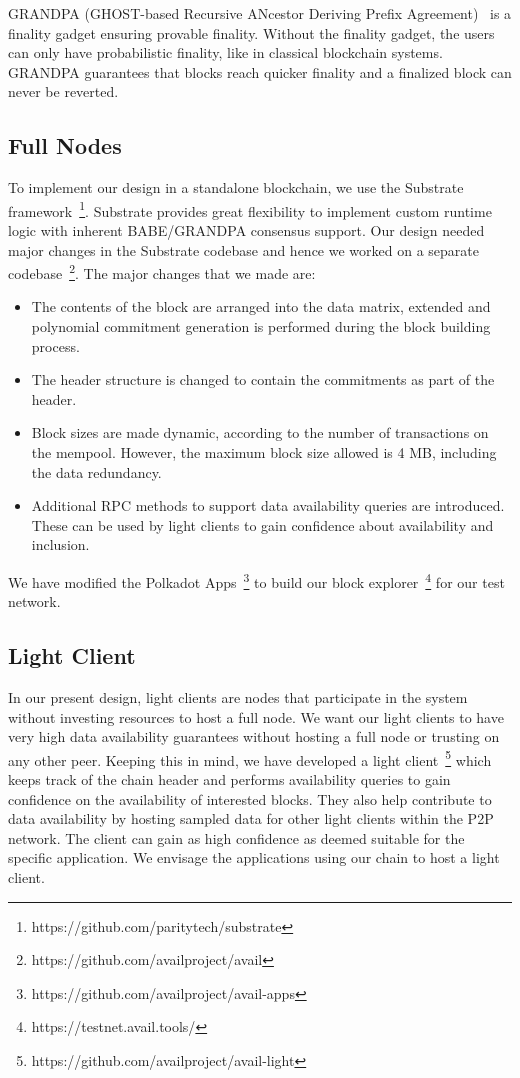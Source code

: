 \documentclass[sigconf, screen=true, nonacm]{acmart}
\begin{document}
        GRANDPA (GHOST-based Recursive ANcestor Deriving Prefix Agreement)~\cite{grandpa} is a finality gadget ensuring provable finality. Without the finality gadget, the users can only have probabilistic finality, like in classical blockchain systems. GRANDPA guarantees that blocks reach quicker finality and a finalized block can never be reverted. 

    \subsection{Full Nodes}
        To implement our design in a standalone blockchain, we use the Substrate framework~\footnote{https://github.com/paritytech/substrate}. Substrate provides great flexibility to implement custom runtime logic with inherent BABE/GRANDPA consensus support. Our design needed major changes in the Substrate codebase and hence we worked on a separate codebase~\footnote{https://github.com/availproject/avail}. The major changes that we made are:
        \begin{itemize}
            \item The contents of the block are arranged into the data matrix, extended and polynomial commitment generation is performed during the block building process. 
            \item The header structure is changed to contain the commitments as part of the header. 
            \item Block sizes are made dynamic, according to the number of transactions on the mempool. However, the maximum block size allowed is 4 MB, including the data redundancy.  
            \item Additional RPC methods to support data availability queries are introduced. These can be used by light clients to gain confidence about availability and inclusion.
        \end{itemize}
        We have modified the Polkadot Apps~\footnote{https://github.com/availproject/avail-apps} to build our block explorer~\footnote{https://testnet.avail.tools/} for our test network. 

    \subsection{Light Client}
        In our present design, light clients are nodes that participate in the system without investing resources to host a full node. We want our light clients to have very high data availability guarantees without hosting a full node or trusting on any other peer. Keeping this in mind, we have developed a light client~\footnote{https://github.com/availproject/avail-light} which keeps track of the chain header and performs availability queries to gain confidence on the availability of interested blocks. They also help contribute to data availability by hosting sampled data for other light clients within the P2P network. The client can gain as high confidence as deemed suitable for the specific application. We envisage the applications using our chain to host a light client.
\end{document}
